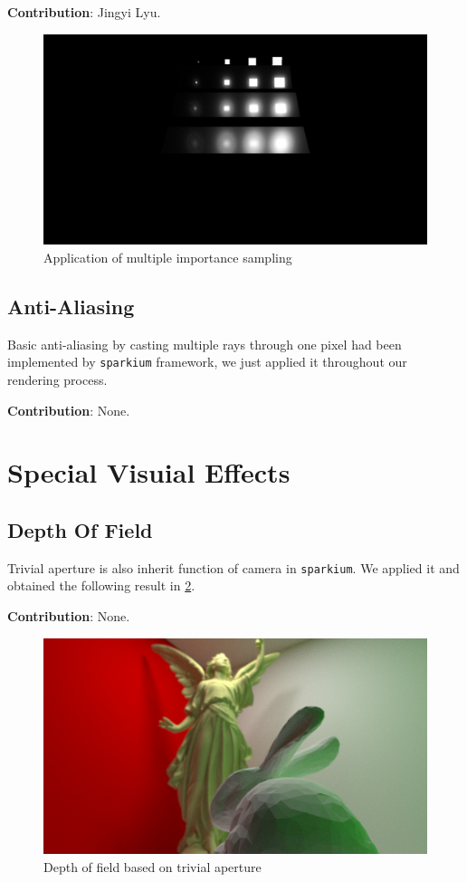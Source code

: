 \documentclass[acmtog]{acmart}
\begin{document}
\noindent \textbf{Contribution}: Jingyi Lyu.

\begin{figure}[h]
	\centering	
	\includegraphics[width=\linewidth]{mis}
	\caption{Application of multiple importance sampling}
	\label{mis}
\end{figure}

\subsection{Anti-Aliasing}

Basic anti-aliasing by casting multiple rays through one pixel had been implemented by \verb|sparkium| framework, we just applied it throughout our rendering process.

\noindent \textbf{Contribution}: None.

\section{Special Visuial Effects}

\subsection{Depth Of Field}

Trivial aperture is also inherit function of camera in \verb|sparkium|. We applied it and obtained the following result in \ref{dof}.

\noindent \textbf{Contribution}: None.

\begin{figure}[h]
	\centering	
	\includegraphics[width=\linewidth]{dof}
	\caption{Depth of field based on trivial aperture}
	\label{dof}
\end{figure}
\end{document}
